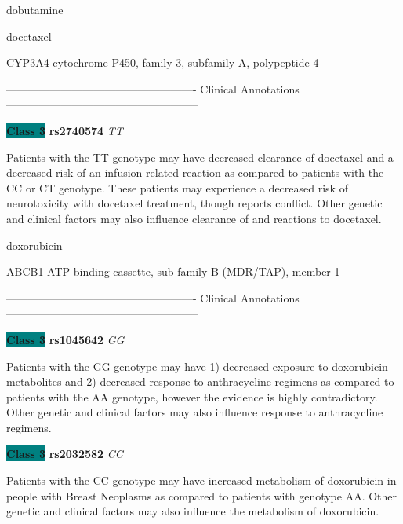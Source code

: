 \documentclass{resume} %
\begin{document}
\begin{rSection}{ dobutamine }
\end{rSection}\begin{rSection}{ docetaxel }
\item[]

\begin{rSubsection}{ CYP3A4 }{ cytochrome P450, family 3, subfamily A, polypeptide 4 }{}{}
\item[]

\item[] ---------------------------------------------------- Clinical Annotations -----------------------------------------------------\newline
\item \textbf{\colorbox{teal} {Class 3}} \textbf{ rs2740574 } \textit{ TT }
\item[] Patients with the TT genotype may have decreased clearance of docetaxel and a decreased risk of an infusion-related reaction as compared to patients with the CC or CT genotype. These patients may experience a decreased risk of neurotoxicity with docetaxel treatment, though reports conflict. Other genetic and clinical factors may also influence clearance of and reactions to docetaxel.
\end{rSubsection}

\end{rSection}\begin{rSection}{ doxorubicin }
\item[]

\begin{rSubsection}{ ABCB1 }{ ATP-binding cassette, sub-family B (MDR/TAP), member 1 }{}{}
\item[]

\item[] ---------------------------------------------------- Clinical Annotations -----------------------------------------------------\newline
\item \textbf{\colorbox{teal} {Class 3}} \textbf{ rs1045642 } \textit{ GG }
\item[] Patients with the GG genotype may have 1) decreased exposure to doxorubicin metabolites and 2) decreased response to anthracycline regimens as compared to patients with the AA genotype, however the evidence is highly contradictory. Other genetic and clinical factors may also influence response to anthracycline regimens.\item \textbf{\colorbox{teal} {Class 3}} \textbf{ rs2032582 } \textit{ CC }
\item[] Patients with the  CC genotype may have increased metabolism of doxorubicin in people with Breast Neoplasms as compared to patients with genotype AA. Other genetic and clinical factors may also influence the metabolism of doxorubicin.
\end{rSubsection}


\end{rSection}
\end{document}
